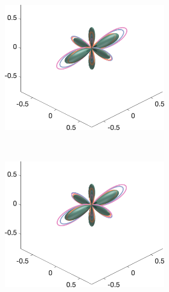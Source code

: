\begin{figure}
  \begin{subfigure}[]{\textwidth}
  \begin{subfigure}[]{0.32\textwidth}
    \includegraphics[width=\textwidth]{figures/frf_experiment/threeperp_fod_3D_b_1000n_4}
  \end{subfigure}
  ~
  \begin{subfigure}[]{0.32\textwidth}
    \includegraphics[width=\textwidth]{figures/frf_experiment/threeperp_fod_3D_b_2000n_4}
  \end{subfigure}
  ~
  \begin{subfigure}[]{0.32\textwidth}

\end{subfigure}
\end{subfigure}
\end{figure}
